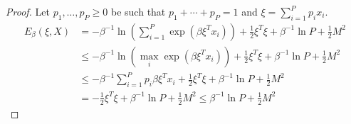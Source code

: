 \begin{lemma}
\begin{proof}
        \noindent Let $p_1,\ldots,p_P\geq0$ be such that $p_1+\cdots+p_P=1$ and $\xi=\sum_{i=1}^{P}p_ix_i$.
        \begin{align*}
            E_\beta\left(\xi,X\right) &= -\beta^{-1}\ln\left(\sum_{i=1}^{P}\exp\left(\beta\xi^Tx_i\right)\right) + \frac12\xi^T\xi + \beta^{-1}\ln P + \frac12 M^2 \\
            &\leq -\beta^{-1}\ln\left(\max_i\exp\left(\beta\xi^Tx_i\right)\right) + \frac12\xi^T\xi + \beta^{-1}\ln P + \frac12 M^2 \\
            &\leq -\beta^{-1}\sum_{i=1}^{P}p_i\beta\xi^Tx_i + \frac12\xi^T\xi + \beta^{-1}\ln P + \frac12 M^2 \\
            &= - \frac12\xi^T\xi + \beta^{-1}\ln P + \frac12 M^2 \leq \beta^{-1}\ln P + \frac12 M^2
        \end{align*}
    \end{proof}
\end{lemma}

